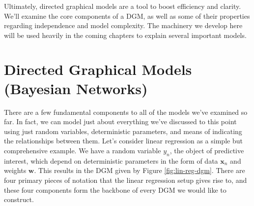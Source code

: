 Ultimately, directed graphical models are a tool to boost efficiency and clarity. We'll examine the core components of a DGM, as well as some of their properties regarding independence and model complexity. The machinery we develop here will be used heavily in the coming chapters to explain several important models.

\section{Directed Graphical Models (Bayesian Networks)}
There are a few fundamental components to all of the models we've examined so far. In fact, we can model just about everything we've discussed to this point using just random variables, deterministic parameters, and means of indicating the relationships between them. Let's consider linear regression as a simple but comprehensive example. We have a random variable $y_n$, the object of predictive interest, which depend on deterministic parameters in the form of data $\textbf{x}_n$ and weights $\textbf{w}$. This results in the DGM given by Figure \ref{fig:lin-reg-dgm}. There are four primary pieces of notation that the linear regression setup gives rise to, and these four components form the backbone of every DGM we would like to construct.

